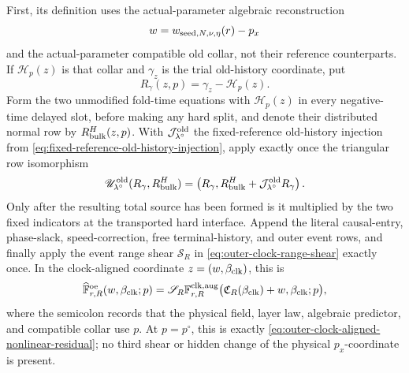 \begin{theorem}
First, its definition uses the actual-parameter algebraic reconstruction
\begin{equation}
 w=w_{{\rm seed},N,\nu,\eta}(r)-p_x              \label{eq:oe-family-actual-parameter-resource}
\end{equation}
and the actual-parameter compatible old collar, not their reference
counterparts.  If \(\mathscr H_p(z)\) is that collar and \(\gamma_z\) is the trial
old-history coordinate, put
\begin{equation}
 R_\gamma(z,p)=\gamma_z-\mathscr H_p(z).        \label{eq:oe-family-collar-mismatch}
\end{equation}
Form the two unmodified fold-time equations with \(\mathscr H_p(z)\) in every
negative-time delayed slot, before making any hard split, and denote their
distributed normal row by \(R_{\rm bulk}^{H}(z,p)\).  With
\(\mathcal J_{\lambda^\circ}^{\rm old}\) the fixed-reference old-history
injection from
\cref{eq:fixed-reference-old-history-injection}, apply exactly once the
triangular row isomorphism
\begin{equation}
 \mathscr U_{\lambda^\circ}^{\rm old}
       (R_\gamma,R_{\rm bulk}^{H})
 =\left(R_\gamma,
     R_{\rm bulk}^{H}
       +\mathcal J_{\lambda^\circ}^{\rm old}R_\gamma\right).
                                                        \label{eq:oe-family-old-history-shear}
\end{equation}
Only after the resulting total source has been formed is it multiplied by
the two fixed indicators at the transported hard interface.  Append the
literal causal-entry, phase-slack, speed-correction, free terminal-history,
and outer event rows, and finally apply the event range shear
\(\mathscr S_R\) in
\cref{eq:outer-clock-range-shear} exactly once.  In the clock-aligned
coordinate \(z=(w,\beta_{\rm clk})\), this is
\begin{equation}
 \widehat{\mathbb F}_{r,R}^{\rm oe}
       (w,\beta_{\rm clk};p)
 =\mathscr S_R\mathbb F_{r,R}^{\rm clk,aug}
   \bigl(\mathfrak C_R(\beta_{\rm clk})+w,
                \beta_{\rm clk};p\bigr),        \label{eq:oe-family-aligned-residual}
\end{equation}
where the semicolon records that the physical field, layer law, algebraic
predictor, and compatible collar use \(p\).  At \(p=p^\circ\), this is
exactly \cref{eq:outer-clock-aligned-nonlinear-residual}; no third shear or
hidden change of the physical \(p_x\)-coordinate is present.


\end{theorem}
